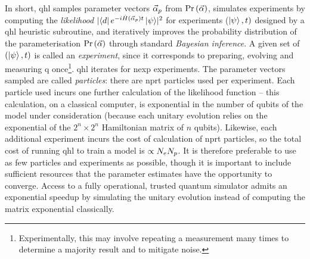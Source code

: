 In short, \gls{qhl} samples parameter vectors $\vec{\alpha}_p$ from $\Pr\left(\vec{\alpha}\right)$, 
    simulates experiments by computing the \emph{likelihood} $\lvert \bra{d} e^{-i \hat{H}(\vec{\alpha}_p)t} \ket{\psi} \rvert^2$
    for experiments ($\ket{\psi}, t)$ designed by a \gls{qhl} heuristic subroutine, 
    and iteratively improves the probability distribution of the parameterisation $\Pr\left(\vec{\alpha}\right)$ 
    through standard \emph{Bayesian inference}. 
A given set of $(\ket{\psi}, t)$ is called an \emph{experiment}, since it corresponds to preparing, evolving and measuring \gls{q} 
once\footnote{Experimentally, this may involve repeating a measurement many times to determine a majority result and to mitigate noise.}. 
\gls{qhl} iterates for \gls{nexp} experiments. 
The parameter vectors sampled are called \emph{\glspl{particle}}: there are \gls{nprt} \glspl{particle} used per experiment. 
Each \gls{particle} used incurs one further calculation of the \gls{likelihood} function -- 
    this calculation, on a classical computer, is exponential in the number of qubits of the model under consideration
    (because each unitary evolution relies on the exponential of the $2^n \times 2^n$ Hamiltonian matrix of $n$ qubits). 
Likewise, each additional experiment incurs the cost of calculation of \gls{nprt} \glspl{particle}, 
    so the total cost of running \gls{qhl} to train a model is $\propto N_e N_p$.
It is therefore preferable to use as few \glspl{particle} and experiments as possible, 
    though it is important to include sufficient resources that the parameter estimates have the opportunity to converge. 
Access to a fully operational, trusted quantum simulator admits an exponential 
    speedup by simulating the unitary evolution instead of computing the matrix exponential classically.
\par 

